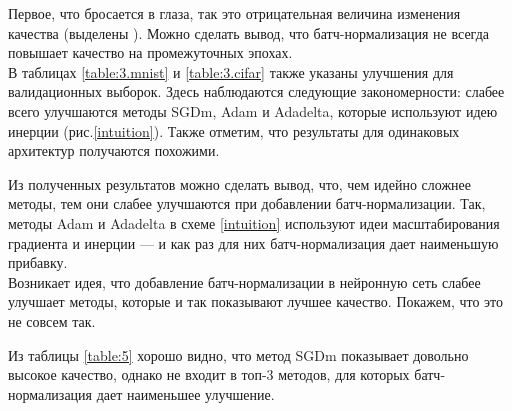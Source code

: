 \documentclass[12pt]{article}
\begin{document}
Первое, что бросается в глаза, так это отрицательная величина изменения качества (выделены \color{black}). Можно сделать вывод, что батч-нормализация не всегда повышает качество на промежуточных эпохах.\\

В таблицах \ref{table:3.mnist} и \ref{table:3.cifar} также указаны улучшения для валидационных выборок. Здесь наблюдаются следующие закономерности: слабее всего улучшаются методы SGDm, Adam и Adadelta, которые используют идею инерции (рис.\ref{intuition}). Также отметим, что результаты для одинаковых архитектур получаются похожими.

Из полученных результатов можно сделать вывод, что, чем идейно сложнее методы, тем они слабее улучшаются при добавлении батч-нормализации. Так, методы Adam и Adadelta в схеме \ref{intuition}  используют идеи масштабирования градиента и инерции --- и как раз для них батч-нормализация дает наименьшую прибавку.\\


Возникает идея, что добавление батч-нормализации в нейронную сеть слабее улучшает методы, которые и так показывают лучшее качество. Покажем, что это не совсем так.

Из таблицы \ref{table:5} хорошо видно, что метод SGDm показывает довольно высокое качество, однако не входит в топ-3 методов, для которых батч-нормализация дает наименьшее улучшение.

%
%
%
%
%
%
%
\end{document}
